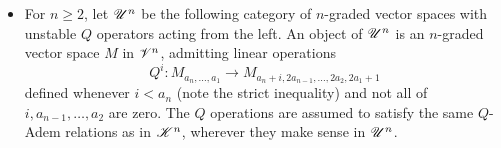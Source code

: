 \documentclass[11pt]{article}
\newcommand{\LL}[1]{{\scrK}^{#1}}%
\newcommand{\GR}[1]{\scrV^{#1}}%
\newcommand{\nontop}[1]{\scrU^{#1}}%
\renewcommand{\Q}{Q}
\begin{document}
\begin{CategoriesOfInterest}
\begin{itemize}

\item For $n\geq2$, let $\nontop{n}$ be the following category of $n$-graded vector spaces with unstable $\Q$ operators acting from the left. An object of $\nontop{n}$ is an $n$-graded vector space $M$ in $\GR{n}$,
admitting linear operations
\[\Q^i:M_{a_n,\ldots,a_1}\to M_{a_n+i,2a_{n-1},\ldots,2a_2,2a_1+1}\]
defined whenever $i< a_n$ (note the strict inequality) and not all of $i,a_{n-1},\ldots,a_{2}$ are zero.
The $\Q$ operations are assumed to satisfy the same $\Q$-Adem relations as in $\LL{n}$, wherever they make sense in $\nontop{n}$. %
\end{itemize}



\end{CategoriesOfInterest}
\end{document}
